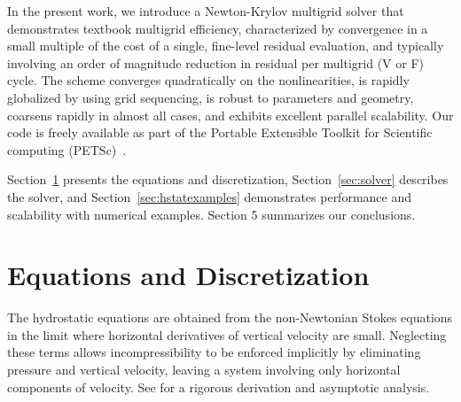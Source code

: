 In the present work, we introduce a Newton-Krylov multigrid solver that demonstrates textbook
multigrid efficiency, characterized by convergence in a small multiple of the cost of a single,
fine-level residual evaluation, and typically involving an order of magnitude reduction in residual
per multigrid (V or F) cycle.  The scheme converges quadratically on the nonlinearities, is rapidly
globalized by using grid sequencing, is robust to parameters and geometry, coarsens rapidly in
almost all cases, and exhibits excellent parallel scalability.  Our code is freely available as part
of the Portable Extensible Toolkit for Scientific computing (PETSc)~\citep{petsc-web-page}.

Section~\ref{sec:equations} presents the equations and discretization, Section~\ref{sec:solver} describes the solver, and Section~\ref{sec:hstatexamples} demonstrates performance and scalability with numerical examples. Section 5 summarizes our conclusions.

\section{Equations and Discretization}\label{sec:equations}
The hydrostatic equations are obtained from the non-Newtonian Stokes equations in the limit where
horizontal derivatives of vertical velocity are small.  Neglecting these terms allows
incompressibility to be enforced implicitly by eliminating pressure and vertical velocity, leaving a
system involving only horizontal components of velocity.  See \citet{schoof2010thin} for a rigorous
derivation and asymptotic analysis.

